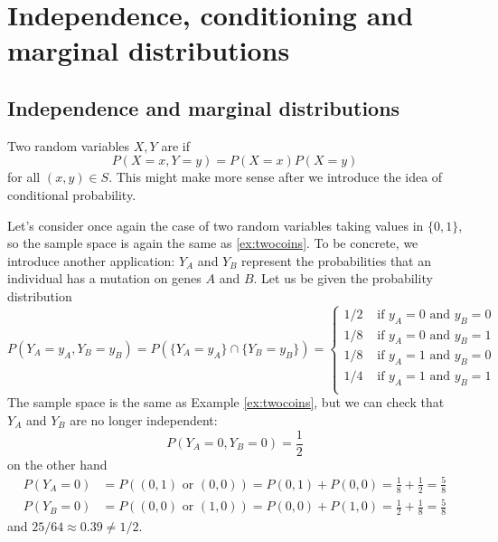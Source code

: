 \section{Independence, conditioning and marginal distributions }

\subsection{Independence and marginal distributions}
Two random variables $X,Y$ are  if 
\begin{equation}
P(X=x,Y=y) = P(X=x)P(X=y)
\end{equation}
for all $(x,y) \in S$. This might make more sense after we introduce the idea of conditional probability. 

\begin{example}\label{ex:mut} Let's consider once again the case of two random variables taking values in $\{0,1\}$, so the sample space is again the same as \ref{ex:twocoins}.  To be concrete, we introduce another application: $Y_A$ and $Y_B$ represent the probabilities that an individual has a mutation on genes $A$ and $B$. Let us be given the probability distribution 
\begin{equation*}\label{eq:gene}
P(Y_A = y_A,Y_B=y_B)  = P(\{Y_A = y_A \}\cap \{Y_B=y_B\}) = \left\{ \begin{array}{cc}
1/2 & \text{ if }y_A=0 \text{ and } y_B = 0\\
1/8 & \text{ if }y_A=0 \text{ and } y_B = 1\\
1/8 & \text{ if }y_A=1 \text{ and } y_B = 0\\
1/4 & \text{ if }y_A=1 \text{ and } y_B = 1\\
\end{array}
 \right.
\end{equation*}
The sample space is the same as Example \ref{ex:twocoins}, but we can check that $Y_A$ and $Y_B$ are no longer independent:
\begin{equation*}
P(Y_A=0,Y_B=0) =  \frac{1}{2}
\end{equation*}
on the other hand 
\begin{align*}
P(Y_A=0) &= P((0,1) \text{ or }(0,0)) = P(0,1) + P(0,0) = \frac{1}{8} + \frac{1}{2} =\frac{5}{8} \\
P(Y_B=0) &= P((0,0) \text{ or }(1,0)) = P(0,0) + P(1,0) = \frac{1}{2} + \frac{1}{8}= \frac{5}{8}
\end{align*}
and $25/64  \approx  0.39 \ne 1/2$. 

\end{example}


